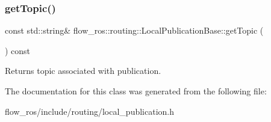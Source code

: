 \subsubsection{\texorpdfstring{get\+Topic()}{getTopic()}}
{\footnotesize\ttfamily const std\+::string\& flow\+\_\+ros\+::routing\+::\+Local\+Publication\+Base\+::get\+Topic (\begin{DoxyParamCaption}{ }\end{DoxyParamCaption}) const\hspace{0.3cm}{\ttfamily [inline]}}



Returns topic associated with publication. 



The documentation for this class was generated from the following file\+:\begin{DoxyCompactItemize}
\item 
flow\+\_\+ros/include/routing/local\+\_\+publication.\+h\end{DoxyCompactItemize}
